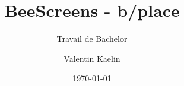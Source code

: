 \author{Valentin Kaelin}


\title{BeeScreens - b/place}

\subtitle{Travail de Bachelor}


\date{\today}


